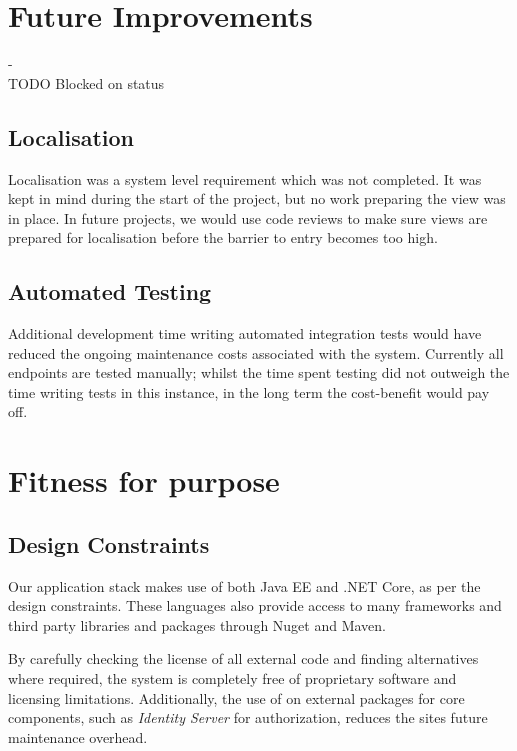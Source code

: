 \section{Future Improvements}

- \\TODO Blocked on status

    \subsection{Localisation}
    \par
    Localisation was a system level requirement which was not completed. It was kept in mind during the start of the project, but no work preparing the view was in place. In future projects, we would use code reviews to make sure views are prepared for localisation before the barrier to entry becomes too high.

    \subsection{Automated Testing}
    \par
    Additional development time writing automated integration tests would have reduced the ongoing maintenance costs associated with the system. Currently all endpoints are tested manually; whilst the time spent testing did not outweigh the time writing tests in this instance, in the long term the cost-benefit would pay off.

\section{Fitness for purpose}
    \subsection{Design Constraints}
    \par
    Our application stack makes use of both Java EE and .NET Core, as per the design constraints. These languages also provide access to many frameworks and third party libraries and packages through Nuget and Maven. 
    
    \par
    By carefully checking the license of all external code and finding alternatives where required, the system is completely free of proprietary software and licensing limitations. Additionally, the use of on external packages for core components, such as \textit{Identity Server} for authorization, reduces the sites future maintenance overhead.

